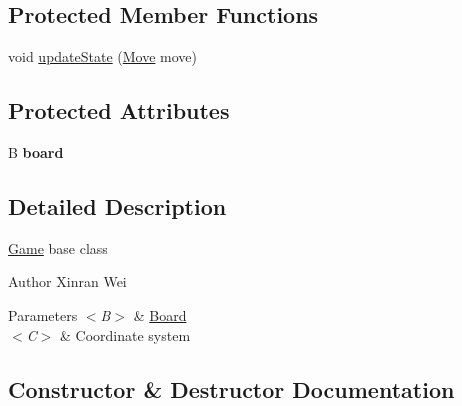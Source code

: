 \subsection*{Protected Member Functions}
\begin{DoxyCompactItemize}
\item 
void \hyperlink{classedu_1_1xwei12_1_1chess_1_1_game_ac5c295030564b282d0112e34400904a8}{update\+State} (\hyperlink{classedu_1_1xwei12_1_1chess_1_1_game_1_1_move}{Move} move)
\end{DoxyCompactItemize}
\subsection*{Protected Attributes}
\begin{DoxyCompactItemize}
\item 
B {\bfseries board}\hypertarget{classedu_1_1xwei12_1_1chess_1_1_game_ac44939b8759bb70aa30a8f84b7666838}{}\label{classedu_1_1xwei12_1_1chess_1_1_game_ac44939b8759bb70aa30a8f84b7666838}

\end{DoxyCompactItemize}


\subsection{Detailed Description}
\hyperlink{classedu_1_1xwei12_1_1chess_1_1_game}{Game} base class \begin{DoxyAuthor}{Author}
Xinran Wei 
\end{DoxyAuthor}

\begin{DoxyParams}{Parameters}
{\em $<$\+B$>$} & \hyperlink{interfaceedu_1_1xwei12_1_1chess_1_1_board}{Board} \\
\hline
{\em $<$\+C$>$} & Coordinate system \\
\hline
\end{DoxyParams}


\subsection{Constructor \& Destructor Documentation}
